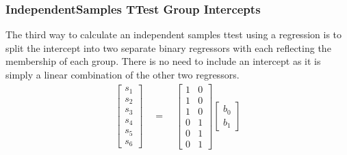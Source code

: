 \documentclass[letterpaper,10pt,english]{sphinxmanual}
\begin{document}
\subsubsection{Independent\sphinxhyphen{}Samples T\sphinxhyphen{}Test \sphinxhyphen{} Group Intercepts}
\label{\detokenize{content/Group_Analysis:independent-samples-t-test-group-intercepts}}
The third way to calculate an independent samples t\sphinxhyphen{}test using a regression is to split the intercept into two separate binary regressors with each reflecting the membership of each group. There is no need to include an intercept as it is simply a linear combination of the other two regressors.
\begin{equation*}
\begin{split}
\begin{bmatrix}
s_1 \\
s_2 \\
s_3 \\
s_4 \\
s_5 \\
s_6
\end{bmatrix}
\quad
=
\quad
\begin{bmatrix}
1 & 0\\
1 & 0\\
1 & 0\\
0 & 1\\
0 & 1\\
0 & 1
\end{bmatrix}
\begin{bmatrix}
b_0 \\
b_1
\end{bmatrix}
\end{split}
\end{equation*}
\end{document}
